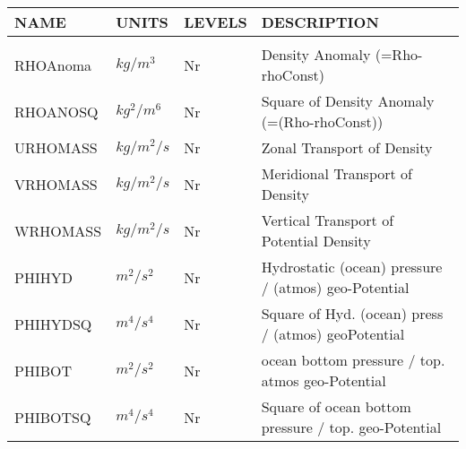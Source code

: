 \newpage
\vspace*{\fill}
\begin{tabular}{llll}
\hline\hline
 NAME & UNITS & LEVELS & DESCRIPTION \\
\hline

&\\
 RHOAnoma & $kg/m^3  $  &  Nr  
         &\begin{minipage}[t]{3in}
          {Density Anomaly (=Rho-rhoConst)}
         \end{minipage}\\
 RHOANOSQ & $kg^2/m^6$  &  Nr  
         &\begin{minipage}[t]{3in}
          {Square of Density Anomaly (=(Rho-rhoConst))}
         \end{minipage}\\
 URHOMASS & $kg/m^2/s$  &  Nr  
         &\begin{minipage}[t]{3in}
          {Zonal Transport of Density}
         \end{minipage}\\
 VRHOMASS & $kg/m^2/s$  &  Nr  
         &\begin{minipage}[t]{3in}
          {Meridional Transport of Density}
         \end{minipage}\\
 WRHOMASS & $kg/m^2/s$  &  Nr  
         &\begin{minipage}[t]{3in}
          {Vertical Transport of Potential Density}
         \end{minipage}\\
 PHIHYD   & $m^2/s^2 $  &  Nr  
         &\begin{minipage}[t]{3in}
          {Hydrostatic (ocean) pressure / (atmos) geo-Potential}
         \end{minipage}\\
 PHIHYDSQ & $m^4/s^4 $  &  Nr  
         &\begin{minipage}[t]{3in}
          {Square of Hyd. (ocean) press / (atmos) geoPotential}
         \end{minipage}\\
 PHIBOT   & $m^2/s^2 $  &  Nr  
         &\begin{minipage}[t]{3in}
          {ocean bottom pressure / top. atmos geo-Potential}
         \end{minipage}\\
 PHIBOTSQ & $m^4/s^4 $  &  Nr  
         &\begin{minipage}[t]{3in}
          {Square of ocean bottom pressure / top. geo-Potential}

\end{minipage}
\end{tabular}
